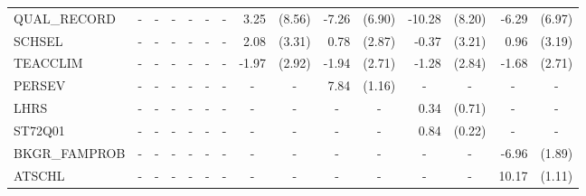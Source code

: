 \documentclass[12pt]{article}%
\begin{document}
\begin{table}[H]
\begin{tabular}{lrlrlrlrlrlrlrl}
			QUAL\_RECORD & \multicolumn{1}{c}{-} & \multicolumn{1}{c}{-} & \multicolumn{1}{c}{-} & \multicolumn{1}{c}{-} & \multicolumn{1}{c}{-} & \multicolumn{1}{c}{-} & 3.25  & (8.56) & -7.26 & (6.90) & -10.28 & (8.20) & -6.29 & (6.97) \\[0.2em]
			SCHSEL & \multicolumn{1}{c}{-} & \multicolumn{1}{c}{-} & \multicolumn{1}{c}{-} & \multicolumn{1}{c}{-} & \multicolumn{1}{c}{-} & \multicolumn{1}{c}{-} & 2.08  & (3.31) & 0.78  & (2.87) & -0.37 & (3.21) & 0.96  & (3.19) \\[0.2em]
			TEACCLIM & \multicolumn{1}{c}{-} & \multicolumn{1}{c}{-} & \multicolumn{1}{c}{-} & \multicolumn{1}{c}{-} & \multicolumn{1}{c}{-} & \multicolumn{1}{c}{-} & -1.97 & (2.92) & -1.94 & (2.71) & -1.28 & (2.84) & -1.68 & (2.71) \\[0.2em]
			PERSEV & \multicolumn{1}{c}{-} & \multicolumn{1}{c}{-} & \multicolumn{1}{c}{-} & \multicolumn{1}{c}{-} & \multicolumn{1}{c}{-} & \multicolumn{1}{c}{-} & \multicolumn{1}{c}{-} & \multicolumn{1}{c}{-} & 7.84  & (1.16) & \multicolumn{1}{c}{-} & \multicolumn{1}{c}{-} & \multicolumn{1}{c}{-} & \multicolumn{1}{c}{-} \\[0.2em]
			LHRS  & \multicolumn{1}{c}{-} & \multicolumn{1}{c}{-} & \multicolumn{1}{c}{-} & \multicolumn{1}{c}{-} & \multicolumn{1}{c}{-} & \multicolumn{1}{c}{-} & \multicolumn{1}{c}{-} & \multicolumn{1}{c}{-} & \multicolumn{1}{c}{-} & \multicolumn{1}{c}{-} & 0.34  & (0.71) & \multicolumn{1}{c}{-} & \multicolumn{1}{c}{-} \\[0.2em]
			ST72Q01 & \multicolumn{1}{c}{-} & \multicolumn{1}{c}{-} & \multicolumn{1}{c}{-} & \multicolumn{1}{c}{-} & \multicolumn{1}{c}{-} & \multicolumn{1}{c}{-} & \multicolumn{1}{c}{-} & \multicolumn{1}{c}{-} & \multicolumn{1}{c}{-} & \multicolumn{1}{c}{-} & 0.84  & (0.22) & \multicolumn{1}{c}{-} & \multicolumn{1}{c}{-} \\[0.2em]
			BKGR\_FAMPROB & \multicolumn{1}{c}{-} & \multicolumn{1}{c}{-} & \multicolumn{1}{c}{-} & \multicolumn{1}{c}{-} & \multicolumn{1}{c}{-} & \multicolumn{1}{c}{-} & \multicolumn{1}{c}{-} & \multicolumn{1}{c}{-} & \multicolumn{1}{c}{-} & \multicolumn{1}{c}{-} & \multicolumn{1}{c}{-} & \multicolumn{1}{c}{-} & -6.96 & (1.89) \\[0.2em]
			ATSCHL & \multicolumn{1}{c}{-} & \multicolumn{1}{c}{-} & \multicolumn{1}{c}{-} & \multicolumn{1}{c}{-} & \multicolumn{1}{c}{-} & \multicolumn{1}{c}{-} & \multicolumn{1}{c}{-} & \multicolumn{1}{c}{-} & \multicolumn{1}{c}{-} & \multicolumn{1}{c}{-} & \multicolumn{1}{c}{-} & \multicolumn{1}{c}{-} & 10.17 & (1.11) \\[0.2em]

\end{tabular}
\end{table}
\end{document}
